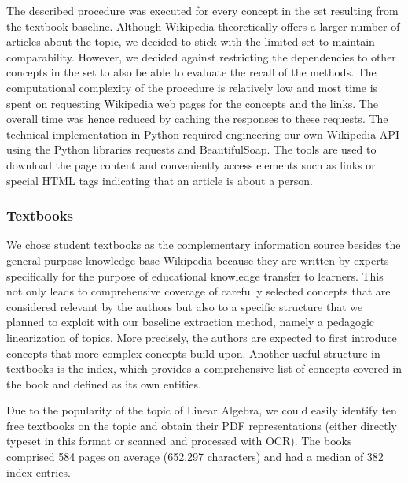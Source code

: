 \documentclass{article}
\begin{document}
The described procedure was executed for every concept in the set resulting from the textbook baseline. Although Wikipedia theoretically offers a larger number of articles about the topic, we decided to stick with the limited set to maintain comparability. However, we decided against restricting the dependencies to other concepts in the set to also be able to evaluate the recall of the methods. The computational complexity of the procedure is relatively low and most time is spent on requesting Wikipedia web pages for the concepts and the links. The overall time was hence reduced by caching the responses to these requests. The technical implementation in Python required engineering our own Wikipedia API using the Python libraries requests and BeautifulSoap. The tools are used to download the page content and conveniently access elements such as links or special HTML tags indicating that an article is about a person.

\subsubsection{Textbooks}
We chose student textbooks as the complementary information source besides the general purpose knowledge base Wikipedia because they are written by experts specifically for the purpose of educational knowledge transfer to learners. This not only leads to comprehensive coverage of carefully selected concepts that are considered relevant by the authors but also to a specific structure that we planned to exploit with our baseline extraction method, namely a pedagogic linearization of topics. More precisely, the authors are expected to first introduce concepts that more complex concepts build upon. Another useful structure in textbooks is the index, which provides a comprehensive list of concepts covered in the book and defined as its own entities.

Due to the popularity of the topic of Linear Algebra, we could easily identify ten free textbooks on the topic and obtain their PDF representations (either directly typeset in this format or scanned and processed with OCR). The books comprised 584 pages on average (652,297 characters) and had a median of 382 index entries.

\end{document}
